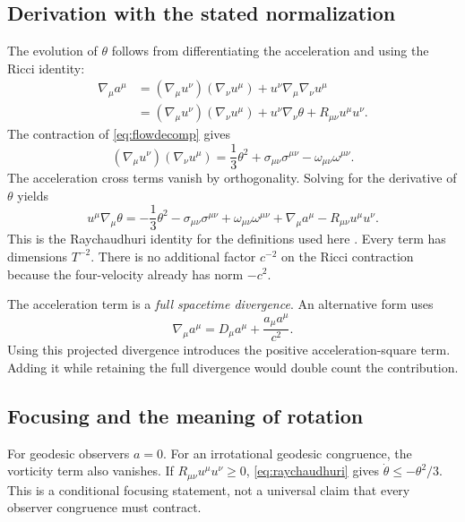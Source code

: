 \documentclass[11pt]{article}
\begin{document}
\subsection{Derivation with the stated normalization}
The evolution of $\theta$ follows from differentiating the acceleration and using the Ricci identity:
\begin{align}
\nabla_\mu a^\mu
&=(\nabla_\mu u^\nu)(\nabla_\nu u^\mu)
+u^\nu\nabla_\mu\nabla_\nu u^\mu\\
&=(\nabla_\mu u^\nu)(\nabla_\nu u^\mu)
+u^\nu\nabla_\nu\theta+R_{\mu\nu}u^\mu u^\nu.
\end{align}
The contraction of \eqref{eq:flowdecomp} gives
\begin{equation}
(\nabla_\mu u^\nu)(\nabla_\nu u^\mu)
=\frac13\theta^2+\sigma_{\mu\nu}\sigma^{\mu\nu}
-\omega_{\mu\nu}\omega^{\mu\nu}.
\end{equation}
The acceleration cross terms vanish by orthogonality. Solving for the derivative of $\theta$ yields
\begin{equation}
\boxed{u^\mu\nabla_\mu\theta=-\frac13\theta^2
-\sigma_{\mu\nu}\sigma^{\mu\nu}+\omega_{\mu\nu}\omega^{\mu\nu}
+\nabla_\mu a^\mu-R_{\mu\nu}u^\mu u^\nu.}
\label{eq:raychaudhuri}
\end{equation}
This is the Raychaudhuri identity for the definitions used here \parencite{Raychaudhuri1955,EllisVanElst1999}. Every term has dimensions $T^{-2}$. There is no additional factor $c^{-2}$ on the Ricci contraction because the four-velocity already has norm $-c^2$.

The acceleration term is a \emph{full spacetime divergence}. An alternative form uses
\begin{equation}
\nabla_\mu a^\mu=D_\mu a^\mu+\frac{a_\mu a^\mu}{c^2}.
\end{equation}
Using this projected divergence introduces the positive acceleration-square term. Adding it while retaining the full divergence would double count the contribution.

\subsection{Focusing and the meaning of rotation}
For geodesic observers $a=0$. For an irrotational geodesic congruence, the vorticity term also vanishes. If $R_{\mu\nu}u^\mu u^\nu\geq0$, \eqref{eq:raychaudhuri} gives $\dot\theta\leq-\theta^2/3$. This is a conditional focusing statement, not a universal claim that every observer congruence must contract.
\end{document}
